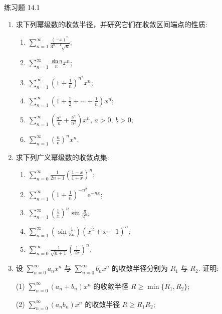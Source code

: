 \begin{exblock}{练习题 14.1}
\begin{enumerate}
  \item 求下列幂级数的收敛半径，并研究它们在收敛区间端点的性质:
  \begin{enumerate}
    \item $\displaystyle\sum_{n=1}^{\infty}\frac{(-x)^{n}}{3^{n-1}\sqrt{n}}$;
    \item $\displaystyle\sum_{n=1}^{\infty}\frac{\sin n}{n}x^{n}$;
    \item $\displaystyle\sum_{n=1}^{\infty}\left(1+\frac{1}{n}\right)^{n^{2}}x^{n}$;
    \item $\displaystyle\sum_{n=1}^{\infty}\left(1+\frac{1}{2}+\cdots+\frac{1}{n}\right)x^{n}$;
    \item $\displaystyle\sum_{n=1}^{\infty}\left(\frac{a^{n}}{n}+\frac{b^{n}}{n^{2}}\right)x^{n}$, $a>0$, $b>0$;
    \item $\displaystyle\sum_{n=1}^{\infty}\left(\frac{n}{\mathrm{e}}\right)^{n}x^{n}$.
  \end{enumerate}
  \item 求下列广义幂级数的收敛点集:
  \begin{enumerate}
    \item $\displaystyle\sum_{n=0}^{\infty}\frac{1}{2n+1}\left(\frac{1-x}{1+x}\right)^{n}$;
    \item $\displaystyle\sum_{n=1}^{\infty}\left(1+\frac{1}{n}\right)^{-n^{2}}\mathrm{e}^{-nx}$;
    \item $\displaystyle\sum_{n=1}^{\infty}\left(\frac{1}{x}\right)^{n}\sin\frac{\pi}{2^{n}}$;
    \item $\displaystyle\sum_{n=1}^{\infty}\left(\sin\frac{1}{3n}\right)(x^{2}+x+1)^{n}$;
    \item $\displaystyle\sum_{n=0}^{\infty}\frac{1}{\sqrt{n+1}}\left(\frac{1}{2x}\right)^{n}$.
  \end{enumerate}
  \item 设 $\sum_{n=0}^{\infty}a_{n}x^{n}$ 与 $\sum_{n=0}^{\infty}b_{n}x^{n}$ 的收敛半径分别为 $R_{1}$ 与 $R_{2}$. 证明:

  (1) $\sum_{n=0}^{\infty}(a_{n}+b_{n})x^{n}$ 的收敛半径 $R\geqslant\min\{R_{1},R_{2}\}$;

  (2) $\sum_{n=0}^{\infty}(a_{n}b_{n})x^{n}$ 的收敛半径 $R\geqslant R_{1}R_{2}$;


\end{enumerate}
\end{exblock}

